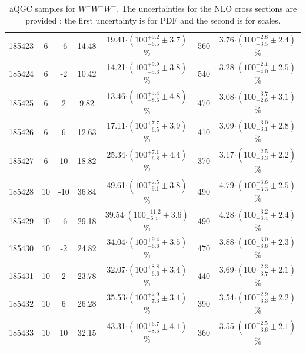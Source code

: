 \begin{table}[ht!]
{\begin{tabular}{c|c|c|c|c|c|c}
185423 & 6     &  -6  &  14.48   &    19.41$\cdot (100^{+9.2}_{-6.5}\pm 3.7 )$\%   &    560       &           3.76$\cdot (100^{+2.8}_{-3.5}\pm 2.4)$\%\\
185424 & 6     &  -2  &  10.42   &    14.21$\cdot (100^{+9.9}_{-5.3}\pm 3.8 )$\%   &    540       &           3.28$\cdot (100^{+2.1}_{-4.0}\pm 2.5)$\%\\
185425 & 6     &  2   &  9.82    &    13.46$\cdot (100^{+5.4}_{-8.6}\pm 4.8 )$\%   &    470       &           3.08$\cdot (100^{+3.7}_{-2.6}\pm 3.1)$\%\\
185426 & 6     &  6   &  12.63   &    17.11$\cdot (100^{+7.7}_{-6.5}\pm 3.9 )$\%   &    410       &           3.09$\cdot (100^{+3.0}_{-3.1}\pm 2.8 )$\% \\
185427 & 6     &  10  &  18.82   &    25.34$\cdot (100^{+7.1}_{-6.8}\pm 4.4 )$\%   &    370       &           3.17$\cdot (100^{+2.5}_{-3.3}\pm 2.2)$\% \\
\hline
185428 & 10    &  -10 &  36.84   &    49.61$\cdot (100^{+7.5}_{-9.1}\pm  3.8)$\%   &    490       &           4.79$\cdot (100^{+3.6}_{-3.3}\pm 2.5)$\%\\
185429 & 10    &  -6  &  29.18   &    39.54$\cdot (100^{+11.2}_{-6.4}\pm 3.6 )$\%   &    490       &           4.28$\cdot (100^{+3.2}_{-3.4}\pm 2.4 )$\%\\
185430 & 10    &  -2  &  24.82   &    34.04$\cdot (100^{+9.4}_{-6.6}\pm 3.5 )$\%   &    470       &           3.88$\cdot (100^{+3.0}_{-3.6}\pm 2.3)$\%\\
185431 & 10    &  2   &  23.78   &    32.07$\cdot (100^{+8.8}_{-6.6}\pm 3.4 )$\%   &    440       &           3.69$\cdot (100^{+2.3}_{-3.7}\pm 2.1)$\%\\
185432 & 10    &  6   &  26.28   &    35.53$\cdot (100^{+7.9}_{-7.3}\pm 3.4 )$\%   &    390       &           3.54$\cdot (100^{+2.9}_{-3.3}\pm 2.2)$\%\\
185433 &  10   &  10  &  32.15   &    43.31$\cdot (100^{+6.7}_{-8.5}\pm 4.1 )$\%   &    360       &           3.55$\cdot (100^{+2.5}_{-3.6}\pm 2.1)$\%\\
\hline 
\end{tabular}
}
\caption{aQGC samples for $W^-W^+W^-$. The uncertainties for the NLO cross sections are provided : the first uncertainty is for PDF and the second is for scales.}
\label{tab:signalNormaMMP}
\end{table}

